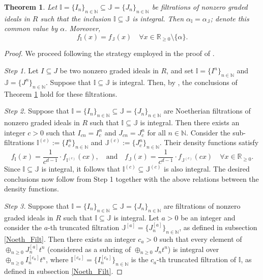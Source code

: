 \documentclass[12pt,a4paper]{amsart}
\theoremstyle{plain}
\newtheorem{theorem}{Theorem}[section]
\theoremstyle{definition}
\numberwithin{equation}{theorem}
\begin{document}
\begin{theorem}\label{density_integral}
Let $\mathbb{I}=\{I_n\}_{n\in\mathbb{N}} \subseteq \mathbb{J}=\{J_n\}_{n\in\mathbb{N}}$ be filtrations of nonzero graded ideals in $R$ such that the inclusion $\mathbb{I} \subseteq \mathbb{J}$ is integral. Then $\alpha_{\mathbb{I}} = \alpha_{\mathbb{J}}$; denote this common value by $\alpha$. Moreover, $$f_{\mathbb{I}}(x) = f_{\mathbb{J}}(x) \quad \forall x\in \mathbb{R}_{\geq 0}\setminus\{\alpha\}.$$
\end{theorem}
\begin{proof}
 We proceed following the strategy employed in the proof of \cite[Theorem 6.9]{CSS19}.

 \textit{Step 1.} Let $I \subseteq J$ be two nonzero graded ideals in $R$, and set $\mathbb{I} = \{I^n\}_{n \in \mathbb{N}}$ and $\mathbb{J} = \{J^n\}_{n \in \mathbb{N}}$. Suppose that $\mathbb{I} \subseteq \mathbb{J}$ is integral. Then, by \cite[Theorem 6.2]{DRT25}, the conclusions of Theorem \ref{density_integral} hold for these filtrations.

 \textit{Step 2.} Suppose that $\mathbb{I}=\{I_n\}_{n\in\mathbb{N}} \subseteq \mathbb{J}=\{J_n\}_{n\in\mathbb{N}}$ are Noetherian filtrations of nonzero graded ideals in $R$ such that $\mathbb{I} \subseteq \mathbb{J}$ is integral. Then there exists an integer $c>0$ such that $I_{cn} = I_c^n$ and $J_{cn} = J_c^n$ for all $n\in\mathbb{N}$. Consider the sub-filtrations $\mathbb{I}^{(c)} :=\{I_c^n\}_{n\in\mathbb{N}}$ and $\mathbb{J}^{(c)} :=\{J_c^n\}_{n\in\mathbb{N}}$. Their density functions satisfy $$f_{\mathbb{I}}(x) = \frac{1}{c^{d-1}}\cdot f_{\mathbb{I}^{(c)}}(cx), \quad \text{and}\quad f_{\mathbb{J}}(x) = \frac{1}{c^{d-1}}\cdot f_{\mathbb{J}^{(c)}}(cx) \quad \forall x\in \mathbb{R}_{\geq 0}.$$ Since $\mathbb{I} \subseteq \mathbb{J}$ is integral, it follows that $\mathbb{I}^{(c)} \subseteq \mathbb{J}^{(c)}$ is also integral. The desired conclusions now follow from Step 1 together with the above relations between the density functions.

 \textit{Step 3.} Suppose that $\mathbb{I}=\{I_n\}_{n\in\mathbb{N}} \subseteq \mathbb{J}=\{J_n\}_{n\in\mathbb{N}}$ are filtrations of nonzero graded ideals in $R$ such that $\mathbb{I} \subseteq \mathbb{J}$ is integral. Let $a>0$ be an integer and consider the $a$-th truncated filtration $\mathbb{J}^{[a]} = \big\{J^{[a]}_n\big\}_{n\in\mathbb{N}}$, as defined in subsection \ref{Noeth_Filt}. Then there exists an integer $c_a>0$ such that every element of $\oplus_{n\geq 0}J^{[a]}_nt^n$ (considered as a subring of $\oplus_{n\geq 0}J_nt^n$) is integral over $\oplus_{n\geq 0}I^{[c_a]}_nt^n$, where $\mathbb{I}^{[c_a]} = \big\{I^{[c_a]}_n\big\}_{n\in\mathbb{N}}$ is the $c_a$-th truncated filtration of $\mathbb{I}$, as defined in subsection \ref{Noeth_Filt}.


\end{proof}
\end{document}
